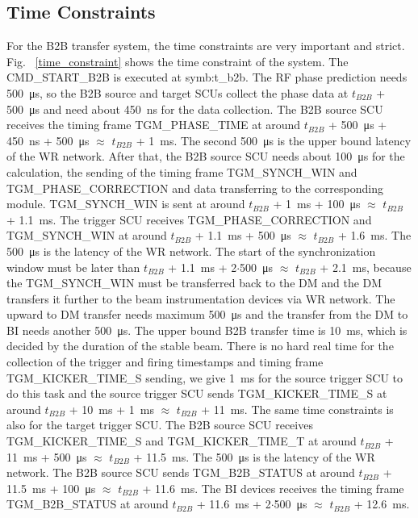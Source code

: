 \subsection{Time Constraints}
For the B2B transfer system, the time constraints are very important and strict. Fig. ~\ref{time_constraint} shows the time constraint of the system. The CMD\_START\_B2B is executed at \gls{symb:t_b2b}. The RF phase prediction needs \SI{500}{\us}, so the B2B source and target SCUs collect the phase data at $t_{B2B}$ + \SI{500}{\us} and need about \SI{450}{\ns} for the data collection. The B2B source SCU receives the timing frame TGM\_PHASE\_TIME at around $t_{B2B}$ + \SI{500}{\us} + \SI{450}{\ns} + \SI{500}{\us} $\approx$ $t_{B2B}$ + \SI{1}{\ms}. The second \SI{500}{\us} is the upper bound latency of the WR network. After that, the B2B source SCU needs about \SI{100}{\us} for the calculation, the sending of the timing frame TGM\_SYNCH\_WIN and TGM\_PHASE\_CORRECTION and data transferring to the corresponding module. TGM\_SYNCH\_WIN is sent at around $t_{B2B}$ + \SI{1}{\ms} + \SI{100}{\us} $\approx$ $t_{B2B}$ + \SI{1.1}{\ms}. The trigger SCU receives TGM\_PHASE\_CORRECTION and TGM\_SYNCH\_WIN at around $t_{B2B}$ + \SI{1.1}{\ms} + \SI{500}{\us} $\approx$ $t_{B2B}$ + \SI{1.6}{\ms}. The \SI{500}{\us} is the latency of the WR network. The start of the synchronization window must be later than $t_{B2B}$ + \SI{1.1}{\ms} + 2$\cdot$\SI{500}{\us} $\approx$ $t_{B2B}$ + \SI{2.1}{\ms}, because the TGM\_SYNCH\_WIN must be transferred back to the DM and the DM transfers it further to the beam instrumentation devices via WR network. The upward to DM transfer needs maximum \SI{500}{\us} and the transfer from the DM to BI needs another \SI{500}{\us}.  The upper bound B2B transfer time is \SI{10}{\ms}, which is decided by the duration of the stable beam. There is no hard real time for the collection of the trigger and firing timestamps and timing frame TGM\_KICKER\_TIME\_S sending, we give \SI{1}{\ms} for the source trigger SCU to do this task and the source trigger SCU sends TGM\_KICKER\_TIME\_S at around $t_{B2B}$ + \SI{10}{\ms} + \SI{1}{\ms} $\approx$ $t_{B2B}$ + \SI{11}{\ms}. The same time constraints is also for the target trigger SCU. The B2B source SCU receives TGM\_KICKER\_TIME\_S and TGM\_KICKER\_TIME\_T at around $t_{B2B}$ + \SI{11}{\ms} + \SI{500}{\us} $\approx$ $t_{B2B}$ + \SI{11.5}{\ms}. The \SI{500}{\us} is the latency of the WR network. The B2B source SCU sends TGM\_B2B\_STATUS at around $t_{B2B}$ + \SI{11.5}{\ms} + \SI{100}{\us} $\approx$ $t_{B2B}$ + \SI{11.6}{\ms}. The BI devices receives the timing frame TGM\_B2B\_STATUS at around $t_{B2B}$ + \SI{11.6}{\ms} + 2$\cdot$\SI{500}{\us} $\approx$ $t_{B2B}$ + \SI{12.6}{\ms}.

